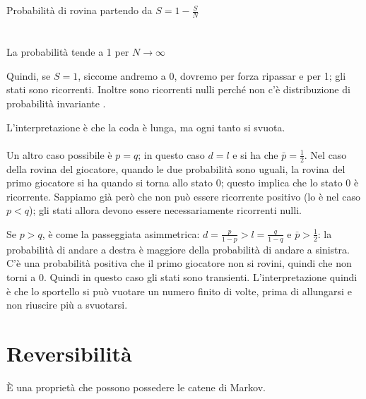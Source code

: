\documentclass[a4paper,12pt]{book}
\begin{document}
\begin{multicols}{2}
	\\
	\\
	Probabilità di rovina partendo da $S = 1- \frac{S}{N} $\\ 
	\\
	\\
	La probabilità tende a 1 per $ N \to \infty $
\end{multicols}

Quindi, se $ S = 1 $, siccome andremo a 0, dovremo per forza ripassar e per 1; gli stati sono ricorrenti. Inoltre sono ricorrenti nulli perché non c'è distribuzione di probabilità invariante . 

L'interpretazione è che la coda è lunga, ma ogni tanto si svuota. 
\\
\\
Un altro caso possibile è $ p = q $; in questo caso $ d = l $ e si ha che $ \bar{p} = \frac{1}{2} $. Nel caso della rovina del giocatore, quando le due probabilità sono uguali, la rovina del primo giocatore si ha quando si torna allo stato 0; questo implica che lo stato 0 è ricorrente. Sappiamo già però che non può essere ricorrente positivo (lo è nel caso $ p < q $); gli stati allora devono essere necessariamente ricorrenti nulli. 

Se $ p > q $, è come la passeggiata asimmetrica: $ d = \frac{p}{1-p} > l = \frac{q}{1-q} $ e $ \bar{p} > \frac{1}{2} $: la probabilità di andare a destra è maggiore della probabilità di andare a sinistra. C'è una probabilità positiva che il primo giocatore non si rovini, quindi che non torni a 0. Quindi in questo caso gli stati sono transienti. L'interpretazione quindi è che lo sportello si può vuotare un numero finito di volte, prima di allungarsi e non riuscire più a svuotarsi. 

\section{Reversibilità}
È una proprietà che possono possedere le catene di Markov. 
\end{document}
